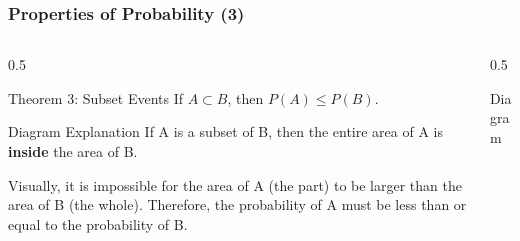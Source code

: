 \begin{frame}
    \frametitle{Properties of Probability (3)}
    \footnotesize
    \begin{columns}[T]
        \begin{column}{0.5\textwidth}
            \begin{block}{Theorem 3: Subset Events}
                If \(A \subset B\), then \(P(A) \le P(B)\).
            \end{block}
            
            \begin{block}{Diagram Explanation}
                If A is a subset of B, then the entire area of A is \textbf{inside} the area of B.
                \vspace{0.5cm}
                
                Visually, it is impossible for the area of A (the part) to be larger than the area of B (the whole). Therefore, the probability of A must be less than or equal to the probability of B.
            \end{block}
        \end{column}
        
        \begin{column}{0.5\textwidth}
            \begin{block}{Diagram}
                \centering
            \end{block}
        \end{column}
    \end{columns}
\end{frame}

